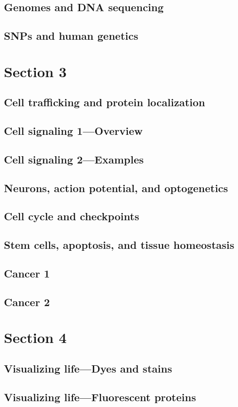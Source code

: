 \documentclass[../introbio.tex]{subfiles}
\begin{document}
\section{Genomes and DNA sequencing}
\section{SNPs and human genetics}
\chapter{Section 3}
\section{Cell trafficking and protein localization}
\section{Cell signaling 1—Overview}
\section{Cell signaling 2—Examples}
\section{Neurons, action potential, and optogenetics}
\section{Cell cycle and checkpoints}
\section{Stem cells, apoptosis, and tissue homeostasis}
\section{Cancer 1}
\section{Cancer 2}
\chapter{Section 4}
\section{Visualizing life—Dyes and stains}
\section{Visualizing life—Fluorescent proteins}
\end{document}
